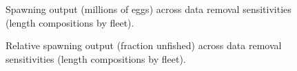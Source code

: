 \documentclass[
]{scrartcl}
\begin{document}
\begin{figure}[H]


\caption{\label{fig-sens_lens1_spout}Spawning output (millions of eggs)
across data removal sensitivities (length compositions by fleet).}

\end{figure}%

\begin{figure}[H]


\caption{\label{fig-sens_lens1_relsp}Relative spawning output (fraction
unfished) across data removal sensitivities (length compositions by
fleet).}

\end{figure}%
\end{document}
